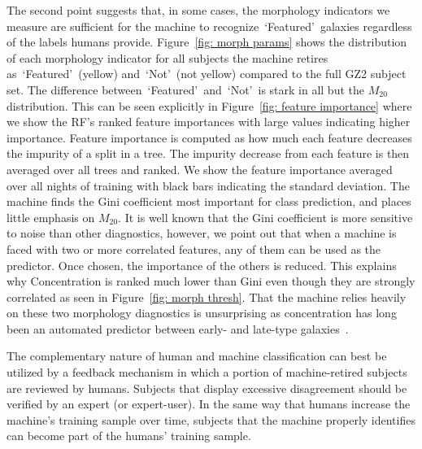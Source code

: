 \documentclass[twocolumn, trackchanges, linenumbers]{aastex6}%
\newcommand{\M}[1]{$M_{\mathrm{#1}}$}
\newcommand{\feat}{`Featured'}
\newcommand{\notfeat}{`Not'}
\begin{document}
The second point suggests that, in some cases, the morphology indicators we measure are 
sufficient for the machine to recognize~\feat~galaxies regardless of the labels humans provide. 
Figure~\ref{fig: morph params} shows the distribution of each 
morphology indicator for all subjects the machine retires as~\feat~(yellow) 
and~\notfeat~(not yellow) compared to the full GZ2 subject set. 
The difference between~\feat~and~\notfeat~is stark in all but the \M{20} distribution. 
This can be seen explicitly in Figure~\ref{fig:  feature importance} where
we show the RF's ranked feature importances with large values indicating higher importance. 
Feature importance is computed as how much each feature decreases the impurity 
of a split in a tree. The impurity decrease from each feature is then averaged over
all trees and ranked. 
We show the feature importance averaged over all nights of training with 
black bars indicating the standard deviation. The machine finds the Gini coefficient 
most important for class prediction, and places little emphasis on \M{20}. 
It is well known that the Gini coefficient is more sensitive to noise than other diagnostics, 
however, we point out that when a machine is faced with two or more correlated features, 
any of them can be used as the predictor. Once chosen, the importance of the others is reduced. 
This explains why Concentration is ranked much lower than Gini even though they 
are strongly correlated as seen in Figure~\ref{fig: morph thresh}. 
That the machine relies heavily on these two morphology diagnostics is unsurprising as
concentration has long been an automated predictor between early- and late-type galaxies~\citep{Abraham1994, Abraham1996, Shen2003}.


The complementary nature of human and machine classification can 
best be utilized by a feedback mechanism in which a portion of machine-retired
subjects are reviewed by humans. Subjects that display excessive disagreement
should be verified by an expert (or expert-user).  In the same way that 
humans increase the machine's training sample over time, subjects that the
machine properly identifies can become part of the humans' training sample. 



\end{document}
